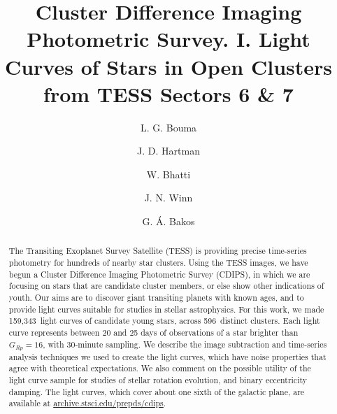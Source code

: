 \documentclass[12pt,twocolumn,tighten]{aastex62}
\newcommand{\numberlcs}{159{,}343\ } %
\newcommand{\numberclusters}{596\ } %
\newcommand{\stscilink}{\url{archive.stsci.edu/prepds/cdips}}
\begin{document}
\title{
  Cluster Difference Imaging Photometric Survey. I.
  Light Curves of Stars in Open Clusters from TESS Sectors 6 \& 7
}


\author[0000-0002-0514-5538]{L. G. Bouma}
%
\author[0000-0001-8732-6166]{J. D. Hartman}
%
\author[0000-0002-0628-0088]{W. Bhatti}
%
\author[0000-0002-4265-047X]{J. N. Winn}
%
\author[0000-0001-7204-6727]{G. \'A. Bakos}

\begin{abstract}
  The Transiting Exoplanet Survey Satellite (TESS) is providing
  precise time-series photometry for hundreds of nearby star clusters.
  Using the TESS images, we have begun a Cluster Difference Imaging
  Photometric Survey (CDIPS), in which we are focusing on stars that
  are candidate cluster members, or else show other indications of
  youth.
  Our aims are to discover giant transiting planets with known ages,
  and to provide light curves suitable for studies in stellar
  astrophysics.
  For this work, we made \numberlcs light curves of candidate young
  stars, across \numberclusters distinct clusters.  Each light curve
  represents between 20 and 25 days of observations of a star brighter
  than $G_{Rp}=16$, with 30-minute sampling.
  We describe the image subtraction and time-series analysis
  techniques we used to create the light curves, which have noise
  properties that agree with theoretical expectations.
  We also comment on the possible utility of the light curve sample
  for studies of stellar rotation evolution, and binary eccentricity
  damping.
  The light curves, which cover about one sixth of the galactic plane,
  are available at \stscilink.
\end{abstract}

\end{document}
